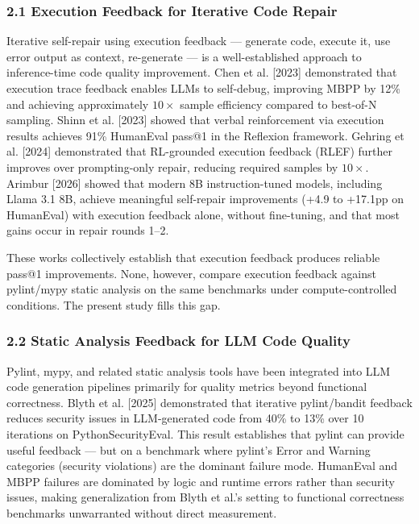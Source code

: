 
\subsubsection{2.1 Execution Feedback for Iterative Code Repair}

Iterative self-repair using execution feedback --- generate code, execute it, use error output as context, re-generate --- is a well-established approach to inference-time code quality improvement. Chen et al. [2023] demonstrated that execution trace feedback enables LLMs to self-debug, improving MBPP by 12\% and achieving approximately $10\times$ sample efficiency compared to best-of-N sampling. Shinn et al. [2023] showed that verbal reinforcement via execution results achieves 91\% HumanEval pass@1 in the Reflexion framework. Gehring et al. [2024] demonstrated that RL-grounded execution feedback (RLEF) further improves over prompting-only repair, reducing required samples by $10\times$. Arimbur [2026] showed that modern 8B instruction-tuned models, including Llama 3.1 8B, achieve meaningful self-repair improvements (+4.9 to +17.1pp on HumanEval) with execution feedback alone, without fine-tuning, and that most gains occur in repair rounds 1--2.

These works collectively establish that execution feedback produces reliable pass@1 improvements. None, however, compare execution feedback against pylint/mypy static analysis on the same benchmarks under compute-controlled conditions. The present study fills this gap.

\subsubsection{2.2 Static Analysis Feedback for LLM Code Quality}

Pylint, mypy, and related static analysis tools have been integrated into LLM code generation pipelines primarily for quality metrics beyond functional correctness. Blyth et al. [2025] demonstrated that iterative pylint/bandit feedback reduces security issues in LLM-generated code from 40\% to 13\% over 10 iterations on PythonSecurityEval. This result establishes that pylint can provide useful feedback --- but on a benchmark where pylint's Error and Warning categories (security violations) are the dominant failure mode. HumanEval and MBPP failures are dominated by logic and runtime errors rather than security issues, making generalization from Blyth et al.'s setting to functional correctness benchmarks unwarranted without direct measurement.

